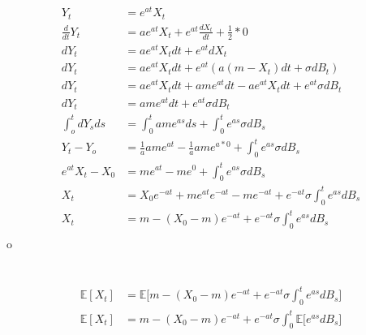 \documentclass[a4paper,12pt]{article}
\begin{document}
\section{}

\begin{align*}
Y_t &= e^{at}X_t \\
\frac{d}{dt}Y_t &= ae^{at}X_t + e^{at}\frac{dX_t}{dt} + \frac{1}{2}*0 \\
dY_t &= ae^{at}X_tdt + e^{at}dX_t \\
dY_t &= ae^{at}X_tdt + e^{at}( a(m - X_t)dt + \sigma dB_t) \\
dY_t &= ae^{at}X_tdt + ame^{at}dt - ae^{at}X_tdt + e^{at} \sigma dB_t \\
dY_t &= ame^{at}dt + e^{at} \sigma dB_t \\
\int_o^t dY_sds &= \int_0^t ame^{as}ds + \int_0^t e^{as} \sigma dB_s \\
Y_t - Y_o &= \frac{1}{a} ame^{at} - \frac{1}{a}ame^{a*0} + \int_0^t e^{as} \sigma dB_s \\
e^{at}X_t - X_0 &= me^{at} - me^{0} + \int_0^t e^{as} \sigma dB_s \\
X_t &= X_0e^{-at} + me^{at}e^{-at} - me^{-at} + e^{-at}\sigma \int_0^t e^{as} dB_s \\
X_t &= m - (X_0 - m)e^{-at} + e^{-at}\sigma \int_0^t e^{as} dB_s \\
\end{align*}
o
\section{}
\begin{align*}
\mathbb{E}[X_t] &= \mathbb{E} \bigg[ m - (X_0 - m)e^{-at} + e^{-at}\sigma \int_0^t e^{as} dB_s \bigg] \\
\mathbb{E}[X_t] &= m - (X_0 - m) e^{-at} + e^{-at}\sigma \int_0^t \mathbb{E} \bigg[  e^{as} dB_s \bigg]
\end{align*}
\end{document}

